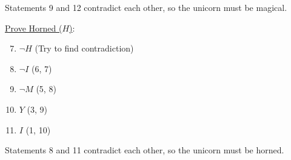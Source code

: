 \documentclass[11pt, oneside]{article}   	%
\begin{document}
Statements 9 and 12 contradict each other, so the unicorn must be magical.

\underline{Prove Horned ($H$)}:

\begin{enumerate}
\setcounter{enumi}{6}
\item $\neg H$ (Try to find contradiction)
\item $\neg I$ (6, 7)
\item $\neg M$ (5, 8)
\item $Y$ (3, 9)
\item $I$ (1, 10)
\end{enumerate}

Statements 8 and 11 contradict each other, so the unicorn must be horned.
\end{document}

